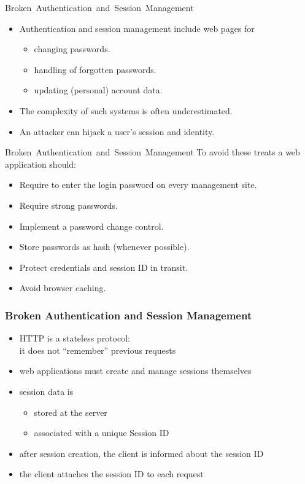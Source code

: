 \documentclass{beamer}
\begin{document}
\begin{printout}
\begin{slide}{Broken~Authentication~and~Session~Management}
  \begin{itemize}\itemsep=2ex
  \item Authentication and session management include web pages for
    \begin{itemize}\itemsep=1.5ex
      \item changing passwords.
      \item handling of forgotten passwords.
      \item updating (personal) account data.
    \end{itemize}
    \item The complexity of such systems is often underestimated.
    \item An attacker can hijack a user's session and identity.
  \end{itemize}
\end{slide}
\begin{slide}{Broken~Authentication~and~Session~Management}
  To avoid these treats a web application should: 
  \begin{itemize}\itemsep=2ex
    \item Require to enter the login password on every management site.
    \item Require strong passwords.
    \item Implement a password change control.
    \item Store passwords as hash (whenever possible).
    \item Protect credentials and session ID in transit.
    \item Avoid browser caching.
  \end{itemize}
\end{slide}
\end{printout}

\begin{frame}
  \frametitle{Broken Authentication and Session Management}
\begin{itemize}\itemsep=1.5ex
\item HTTP is a stateless protocol:\\
it does not ``remember'' previous requests
\item web applications must create and manage sessions
themselves
\item session data is
  \begin{itemize}
  \item stored at the server
  \item associated with a unique Session ID
  \end{itemize}
\item after session creation, the client is informed about the
session ID
\item the client attaches the session ID to each request
\end{itemize}
\end{frame}
\end{document}
